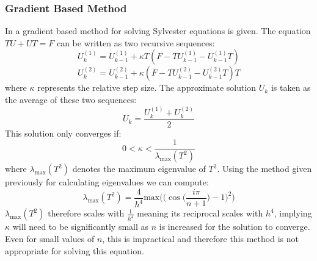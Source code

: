 \documentclass{article}
\numberwithin{equation}{section}
\begin{document}
\subsubsection{Gradient Based Method}
In \cite{Zhou} a gradient based method for solving Sylvester equations is given. The equation $TU + UT = F$ can be written as two recursive sequences:
	\begin{equation}
	U_k^{(1)} = U_{k-1}^{(1)} + \kappa T(F-TU_{k-1}^{(1)} - U_{k-1}^{(1)}T)
	\end{equation}
	\begin{equation}
	U_k^{(2)} = U_{k-1}^{(2)} + \kappa (F-TU_{k-1}^{(2)} - U_{k-1}^{(2)}T)T
	\end{equation}
where $\kappa$ represents the relative step size. The approximate solution $U_k$ is taken as the average of these two sequences:
	\begin{equation}
	U_k = \frac{U_k^{(1)} + U_k^{(2)}}{2}
	\end{equation}
This solution only converges if:
	\begin{equation}
	0 < \kappa < \frac{1}{\lambda_{\text{max}}(T^2)} 
	\end{equation}
where $\lambda_{\text{max}}(T^2)$ denotes the maximum eigenvalue of $T^2$. Using the method given previously for calculating eigenvalues we can compute:
\begin{equation}
\lambda_{\text{max}}(T^2) = \frac{4}{h^4} \text{max} \Big( \big( \cos{\Big(\frac{i \pi}{n+1} \Big) } -1 \big)^2 \Big)
\end{equation}
$\lambda_{\text{max}}(T^2)$ therefore scales with $\frac{1}{h^4}$ meaning its reciprocal scales with $h^4$, implying $\kappa$ will need to be significantly small as $n$ is increased for the solution to converge. Even for small values of $n$, this is impractical and therefore this method is not appropriate for solving this equation.
\end{document}

